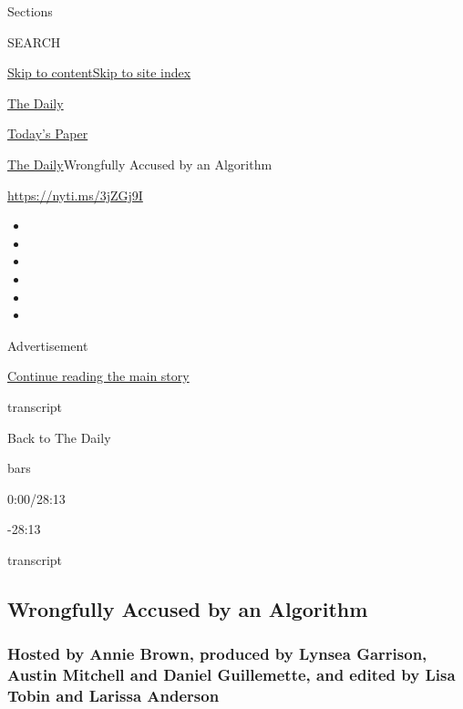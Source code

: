 Sections

SEARCH

\protect\hyperlink{site-content}{Skip to
content}\protect\hyperlink{site-index}{Skip to site index}

\href{https://www.nytimes.com/podcasts/the-daily}{The Daily}

\href{https://myaccount.nytimes.com/auth/login?response_type=cookie\&client_id=vi}{}

\href{https://www.nytimes.com/section/todayspaper}{Today's Paper}

\href{/podcasts/the-daily}{The Daily}\textbar{}Wrongfully Accused by an
Algorithm

\url{https://nyti.ms/3jZGj9I}

\begin{itemize}
\item
\item
\item
\item
\item
\item
\end{itemize}

Advertisement

\protect\hyperlink{after-top}{Continue reading the main story}

transcript

Back to The Daily

bars

0:00/28:13

-28:13

transcript

\hypertarget{wrongfully-accused-by-an-algorithm}{%
\subsection{Wrongfully Accused by an
Algorithm}\label{wrongfully-accused-by-an-algorithm}}

\hypertarget{hosted-by-annie-brown-produced-by-lynsea-garrison-austin-mitchell-and-daniel-guillemette-and-edited-by-lisa-tobin-and-larissa-anderson}{%
\subsubsection{Hosted by Annie Brown, produced by Lynsea Garrison,
Austin Mitchell and Daniel Guillemette, and edited by Lisa Tobin and
Larissa
Anderson}\label{hosted-by-annie-brown-produced-by-lynsea-garrison-austin-mitchell-and-daniel-guillemette-and-edited-by-lisa-tobin-and-larissa-anderson}}

